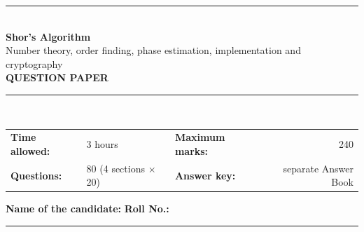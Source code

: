 \documentclass[11pt,a4paper]{article}
\begin{document}
\pagestyle{fancy}\fancyhf{}
\renewcommand{\headrulewidth}{0.4pt}

\thispagestyle{empty}
\begin{center}
{\color{brand}\rule{\linewidth}{1.2pt}}\\[6pt]
{\Huge\bfseries\color{brand} Shor's Algorithm}\\[4pt]
{\Large Number theory, order finding, phase estimation, implementation and cryptography}\\[4pt]
{\large\bfseries QUESTION PAPER}\\[2pt]
{\color{brand}\rule{\linewidth}{1.2pt}}\\[1pt]
\end{center}
\vspace{-2pt}
\begin{tabularx}{\linewidth}{@{}lXlr@{}}
\textbf{Time allowed:} & 3 hours & \textbf{Maximum marks:} & 240\\
\textbf{Questions:} & 80 (4 sections $\times$ 20) & \textbf{Answer key:} & separate Answer Book
\end{tabularx}
\vspace{6pt}

\textbf{Name of the candidate:} \hrulefill\quad \textbf{Roll No.:} \rule{35mm}{0.4pt}
\end{document}
